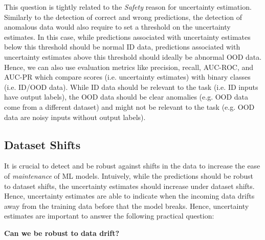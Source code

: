 This question is tightly related to the \emph{Safety} reason for uncertainty estimation. Similarly to the detection of correct and wrong predictions, the detection of anomalous data would also require to set a threshold on the uncertainty estimates. In this case, while predictions associated with uncertainty estimates below this threshold should be normal ID data, predictions associated with uncertainty estimates above this threshold should ideally be abnormal OOD data. Hence, we can also use evaluation metrics like precision, recall, AUC-ROC, and AUC-PR which compare scores (i.e. uncertainty estimates) with binary classes (i.e. ID/OOD data). While ID data should be relevant to the task (i.e. ID inputs have output labels), the OOD data should be clear anomalies (e.g. OOD data come from a different dataset) and might not be relevant to the task (e.g. OOD data are noisy inputs without output labels).

\subsection{Dataset Shifts}

It is crucial to detect and be robust against shifts in the data to increase the ease of \emph{maintenance} of ML models. Intuively, while the predictions should be robust to dataset shifts, the uncertainty estimates should increase under dataset shifts. Hence, uncertainty estimates are able to indicate when the incoming data drifts away from the training data before that the model breaks. Hence, uncertainty estimates are important to answer the following practical question:

\begin{center}
    \textbf{Can we be robust to data drift?}
\end{center}

